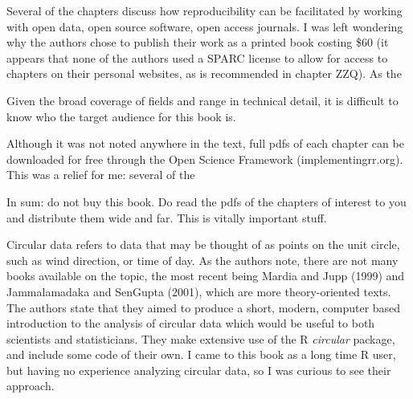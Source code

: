 \documentclass[12pt]{article}
\begin{document}
Several of the chapters discuss how reproducibility can be facilitated by working
with open data, open source software, open access journals.  I was left
wondering why the authors chose to publish their work as a printed book costing
\$60 (it appears that none of the authors used a SPARC license to allow for 
access to chapters on their personal websites, as is recommended in chapter ZZQ).
As the 

Given the broad coverage of fields and range in technical detail, it is
difficult to know who the target audience for this book is.

Although it was not noted anywhere in the text, full pdfs of each chapter
can be downloaded for free through the Open Science Framework (implementingrr.org).
This was a relief for me: several of the 

In sum: do not buy this book. Do read the pdfs of the chapters of interest to you
and distribute them wide and far. This is vitally important stuff.



























Circular data refers to data that may be thought of as points on the
unit circle, such as wind direction, or time of day.  As the authors
note, there are not many books available on the topic, the most recent
being Mardia and Jupp (1999) and Jammalamadaka and SenGupta (2001),
which are more theory-oriented texts.  The authors state that they
aimed to produce a short, modern, computer based introduction to the
analysis of circular data which would be useful to both scientists and
statisticians.  They make extensive use of the R {\em circular}
package, and include some code of their own.  I came to this book as a
long time R user, but having no experience analyzing circular data,
so I was curious to see their approach.
\end{document}
